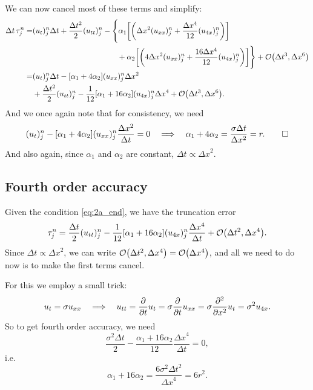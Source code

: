 \documentclass[11pt,letter, swedish, english
]{article}
\newcommand{\Dx}{\ensuremath{\Delta{x}}}
\newcommand{\Dt}{\ensuremath{\Delta{t}}}
\begin{document}
We can now cancel most of these terms and simplify:
\begin{equation}
\begin{aligned}
\Dt\,\tau_j^n=& (u_t)_j^n\Dt+\frac{\Dt^2}{2}(u_{tt})_j^n
-\Bigg\{\alpha_1\qty[
\qty(\Dx^2(u_{xx})_j^n+\frac{\Dx^4}{12}(u_{4x})_j^n)]
\\ &\hspace{110pt}
+\alpha_2\qty[
\qty(4\Dx^2(u_{xx})_j^n+\frac{16\Dx^4}{12}(u_{4x})_j^n)]
\Bigg\} +\order{\Dt^3, \Dx^6}\\
=& (u_t)_j^n\Dt -[\alpha_1+4\alpha_2](u_{xx})_j^n\Dx^2\\
&+\frac{\Dt^2}{2}(u_{tt})_j^n-\frac{1}{12}[\alpha_1+16\alpha_2](u_{4x})_j^n\Dx^4
+\order{\Dt^3, \Dx^6}.
\end{aligned}
\end{equation}
And we once again note that for consistency, we need 
\begin{equation}\label{eq:2a_end}
(u_t)_j^n-[\alpha_1+4\alpha_2](u_{xx})_j^n\frac{\Dx^2}{\Dt}=0
\quad\Longrightarrow\quad
\alpha_1+4\alpha_2=\frac{\sigma\Dt}{\Dx^2}=r.
\qed
\end{equation}
And also again, since $\alpha_1$ and $\alpha_2$ are constant,
$\Dt\propto\Dx^2$. 

\subsection{Fourth order accuracy}

Given the condition \eqref{eq:2a_end}, we have the truncation error
\begin{equation}
\tau_j^n=\frac{\Dt}{2}(u_{tt})_j^n
-\frac{1}{12}[\alpha_1+16\alpha_2](u_{4x})_j^n\frac{\Dx^4}{\Dt}
+\order{\Dt^2, \Dx^4}.
\end{equation}
Since $\Dt\propto\Dx^2$, we can write $\order{\Dt^2,
  \Dx^4}=\order{\Dx^4}$, and all we need to do now is to make the
first terms cancel.

For this we employ a small trick:
\begin{equation}
u_t=\sigma u_{xx}
\quad\Longrightarrow\quad
u_{tt}=\pdv{t}u_t=\sigma\pdv{t}u_{xx}
=\sigma\pdv[2]{x}u_t=\sigma^2u_{4x}.
\end{equation}
So to get fourth order accuracy, we need
\begin{equation}
\frac{\sigma^2\Dt}{2}-\frac{\alpha_1+16\alpha_2}{12}\frac{\Dx^4}{\Dt}=0,
\end{equation}
i.e.
\begin{equation}
\alpha_1+16\alpha_2=\frac{6\sigma^2\Dt^2}{\Dx^4}=6r^2.
\end{equation}
\end{document}
